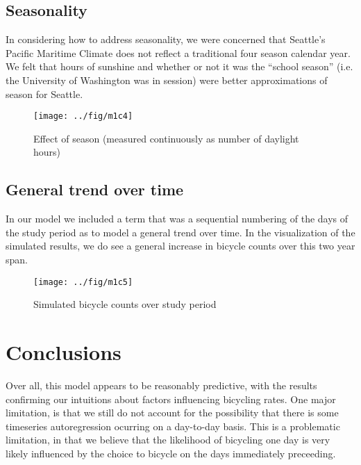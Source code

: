 \documentclass[final]{beamer}
\begin{document}
\begin{frame}[t]
\begin{multicols}{3}
\subsection{Seasonality}
In considering how to address seasonality, we were concerned that
Seattle's Pacific Maritime Climate does not reflect a traditional four
season calendar year. We felt that hours of sunshine and whether or
not it was the ``school season'' (i.e. the University of Washington
was in session) were better approximations of season for Seattle.

\begin{figure}[htbp]
\begin{center}
\texttt{[image: ../fig/m1c4]}
\caption{Effect of season (measured continuously as number of daylight
  hours)}
\label{fg:daylight}
\end{center}
\end{figure}

\subsection{General trend over time}
In our model we included a term that was a sequential numbering of the
days of the study period as to model a general trend over time. In the
visualization of the simulated results, we do see a general increase
in bicycle counts over this two year span.

\begin{figure}[htbp]
\begin{center}
\texttt{[image: ../fig/m1c5]}
\caption{Simulated bicycle counts over study period}
\label{fg:trend}
\end{center}
\end{figure}


\section{Conclusions}
Over all, this model appears to be reasonably
predictive, with the results confirming our intuitions about factors
influencing bicycling rates. One major limitation, is that we still do
not account for the possibility that there is some timeseries
autoregression ocurring on a day-to-day basis. This is a problematic
limitation, in that we believe that the likelihood of bicycling one
day is very likely influenced by the choice to bicycle on the days
immediately preceeding.



\end{multicols}
\end{frame}
\end{document}
